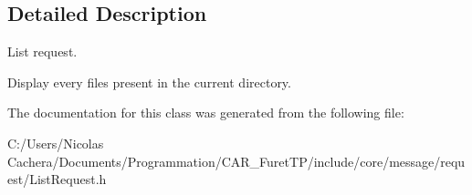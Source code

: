 \subsection{Detailed Description}
List request. 

Display every files present in the current directory. 

The documentation for this class was generated from the following file\+:\begin{DoxyCompactItemize}
\item 
C\+:/\+Users/\+Nicolas Cachera/\+Documents/\+Programmation/\+C\+A\+R\+\_\+\+Furet\+T\+P/include/core/message/request/List\+Request.\+h\end{DoxyCompactItemize}
